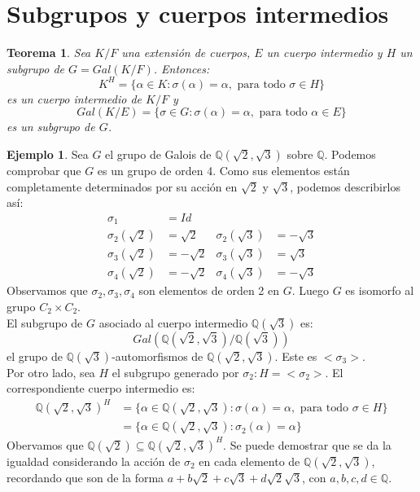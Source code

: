 \documentclass{report}
\newtheorem{theorem}{Teorema}[chapter]
\theoremstyle{remark}
\theoremstyle{definition}
\theoremstyle{definition}
\theoremstyle{definition}
\newtheorem*{example}{Ejemplo}
\begin{document}
\section{Subgrupos y cuerpos intermedios}

\begin{theorem}
    Sea $K/F$ una extensión de cuerpos, $E$ un cuerpo intermedio y $H$ un subgrupo de $G = Gal(K/F)$. Entonces:
    $$K^H = \{ \alpha \in K : \sigma(\alpha) = \alpha, \text{ para todo } \sigma \in H \}$$
    es un cuerpo intermedio de $K/F$ y
    $$Gal(K/E) = \{ \sigma \in G : \sigma(\alpha) = \alpha, \text{ para todo } \alpha \in E \}$$
    es un subgrupo de $G$.
\end{theorem}

\begin{example}
    Sea $G$ el grupo de Galois de $\mathbb{Q}(\sqrt{2}, \sqrt{3})$ sobre $\mathbb{Q}$.
    Podemos comprobar que $G$ es un grupo de orden 4.
    Como sus elementos están completamente determinados por su acción en $\sqrt{2}$ y $\sqrt{3}$, podemos describirlos así:
    \begin{align*}
        \sigma_1           & = Id                                           \\
        \sigma_2(\sqrt{2}) & = \sqrt{2}  & \sigma_2(\sqrt{3}) & = -\sqrt{3} \\
        \sigma_3(\sqrt{2}) & = -\sqrt{2} & \sigma_3(\sqrt{3}) & = \sqrt{3}  \\
        \sigma_4(\sqrt{2}) & = -\sqrt{2} & \sigma_4(\sqrt{3}) & = -\sqrt{3}
    \end{align*}
    Observamos que $\sigma_2, \sigma_3, \sigma_4$ son elementos de orden 2 en $G$.
    Luego $G$ es isomorfo al grupo $C_2 \times C_2$.\\
    El subgrupo de $G$ asociado al cuerpo intermedio $\mathbb{Q}(\sqrt{3})$ es:
    $$Gal(\mathbb{Q}(\sqrt{2}, \sqrt{3}) / \mathbb{Q}(\sqrt{3}))$$
    el grupo de $\mathbb{Q}(\sqrt{3})$-automorfismos de $\mathbb{Q}(\sqrt{2}, \sqrt{3})$. Este es $< \sigma_3 >$.\\
    Por otro lado, sea $H$ el subgrupo generado por $\sigma_2 : H = < \sigma_2 >$.
    El correspondiente cuerpo intermedio es:
    \begin{align*}
        \mathbb{Q}(\sqrt{2}, \sqrt{3})^H & = \{ \alpha \in \mathbb{Q}(\sqrt{2}, \sqrt{3}) : \sigma(\alpha) = \alpha, \text{ para todo } \sigma \in H \} \\
                                         & = \{ \alpha \in \mathbb{Q}(\sqrt{2}, \sqrt{3}) : \sigma_2(\alpha) = \alpha \}
    \end{align*}
    Obervamos que $\mathbb{Q}(\sqrt{2}) \subseteq \mathbb{Q}(\sqrt{2}, \sqrt{3})^H$.
    Se puede demostrar que se da la igualdad considerando la acción de $\sigma_2$ en cada elemento de $\mathbb{Q}(\sqrt{2}, \sqrt{3})$, recordando que son de la forma $a + b\sqrt{2} + c\sqrt{3} + d\sqrt{2}\sqrt{3}$, con $a, b, c, d \in \mathbb{Q}$.
\end{example}
\end{document}
